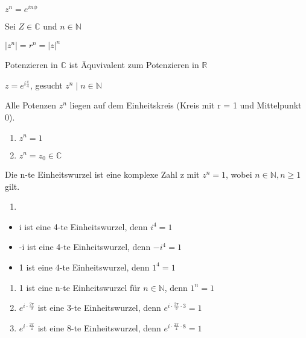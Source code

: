 \documentclass{../tudscript}
\begin{document}
\(z^n = e^{i n \phi}\)

\hypertarget{bemerkung}{%
\label{bemerkung}}

Sei \(Z \in \mathbb{C}\) und \(n \in \mathbb{N}\)

\(| z^n | = r^n = | z |^n\)

Potenzieren in \(\mathbb{C}\) ist Äquvivalent zum Potenzieren in
\(\mathbb{R}\)

\hypertarget{beispiel}{%
\label{beispiel}}

\(z = e^{i \frac{\pi}{4}}\), gesucht \({z^n \mid n \in \mathbb{N} }\)

Alle Potenzen \(z^n\) liegen auf dem Einheitskreis (Kreis mit r = 1 und
Mittelpunkt 0).

\hypertarget{wurzelziehen-von-komplexen-zahlen}{%
\label{wurzelziehen-von-komplexen-zahlen}}

\begin{enumerate}
\def\labelenumi{\arabic{enumi}.}
\tightlist
\item
  \(z^n = 1\)
\item
  \(z^n = z_{0} \in \mathbb{C}\)
\end{enumerate}

\hypertarget{definition-einheitswurzel}{%
\label{definition-einheitswurzel}}

Die n-te Einheitswurzel ist eine komplexe Zahl z mit \(z^n = 1\), wobei
\(n\in \mathbb{N}, n \geq 1\) gilt.

\hypertarget{beispiele}{%
\label{beispiele}}

\begin{enumerate}
\def\labelenumi{\arabic{enumi}.}
\item
\end{enumerate}

\begin{itemize}
\tightlist
\item
  i ist eine 4-te Einheitswurzel, denn \(i^4 = 1\)
\item
  -i ist eine 4-te Einheitswurzel, denn \(-i^4 = 1\)
\item
  1 ist eine 4-te Einheitswurzel, denn \(1^4 = 1\)
\end{itemize}

\begin{enumerate}
\def\labelenumi{\arabic{enumi}.}
\setcounter{enumi}{1}
\tightlist
\item
  1 ist eine n-te Einheitswurzel für \(n \in \mathbb{N}\), denn
  \(1^n = 1\)
\item
  \(e^{i \cdot \frac{2 \pi}{3}}\) ist eine 3-te Einheitswurzel, denn
  \(e^{i \cdot \frac{2 \pi}{3} \cdot 3} = 1\)
\item
  \(e^{i \cdot \frac{2 \pi}{4}}\) ist eine 8-te Einheitswurzel, denn
  \(e^{i \cdot \frac{2 \pi}{4} \cdot 8} = 1\)
\end{enumerate}
\end{document}

